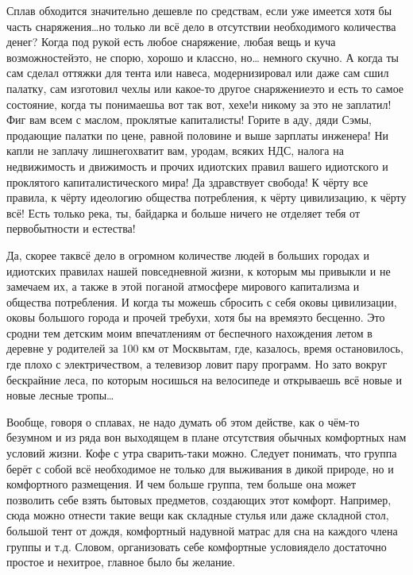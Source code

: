 Сплав обходится значительно дешевле по средствам, если уже имеется хотя бы часть снаряжения\ldots но только ли всё дело в отсутствии необходимого количества денег? Когда под рукой есть любое снаряжение, любая вещь и куча возможностей\mdash это, не спорю, хорошо и классно, но… немного скучно. А когда ты сам сделал оттяжки для тента или навеса, модернизировал или даже сам сшил палатку, сам изготовил чехлы или какое-то другое снаряжение\mdash это и есть то самое состояние, когда ты понимаешь\mdash а вот так вот, хе\sdash хе!\mdash и никому за это не заплатил! Фиг вам всем с маслом, проклятые капиталисты! Горите в аду, дяди Сэмы, продающие палатки по цене, равной половине и выше зарплаты инженера!  Ни капли не заплачу лишнего\mdash хватит вам, уродам, всяких НДС, налога на недвижимость и движимость и прочих идиотских правил вашего идиотского и проклятого капиталистического мира! Да здравствует свобода! К чёрту все правила, к чёрту идеологию общества потребления, к чёрту цивилизацию, к чёрту всё! Есть только река, ты, байдарка и больше ничего не отделяет тебя от первобытности и естества! 

Да, скорее так\mdash всё дело в огромном количестве людей в больших городах и идиотских правилах нашей повседневной жизни, к которым мы привыкли и не замечаем их, а также в этой поганой атмосфере мирового капитализма и общества потребления. И когда ты можешь сбросить с себя оковы цивилизации, оковы большого города и прочей требухи, хотя бы на время\mdash это бесценно. Это сродни тем детским моим впечатлениям от беспечного нахождения летом в деревне у родителей за 100 км от Москвы\mdash там, где, казалось, время остановилось, где плохо с электричеством, а телевизор ловит пару программ. Но зато вокруг бескрайние леса, по которым носишься на велосипеде и открываешь всё новые и новые лесные тропы\ldots 

Вообще, говоря о сплавах, не надо думать об этом действе, как о чём-то безумном и из ряда вон выходящем в плане отсутствия обычных комфортных нам условий жизни. Кофе с утра сварить-таки можно. Следует понимать, что группа берёт с собой всё необходимое не только для выживания в дикой природе, но и комфортного размещения. И чем больше группа, тем больше она может позволить себе взять бытовых предметов, создающих этот комфорт. Например, сюда можно отнести такие вещи как складные стулья или даже складной стол, большой тент от дождя, комфортный надувной матрас для сна на каждого члена группы и т.д. Словом, организовать себе комфортные условия\mdash дело достаточно простое и нехитрое, главное было бы желание. 

